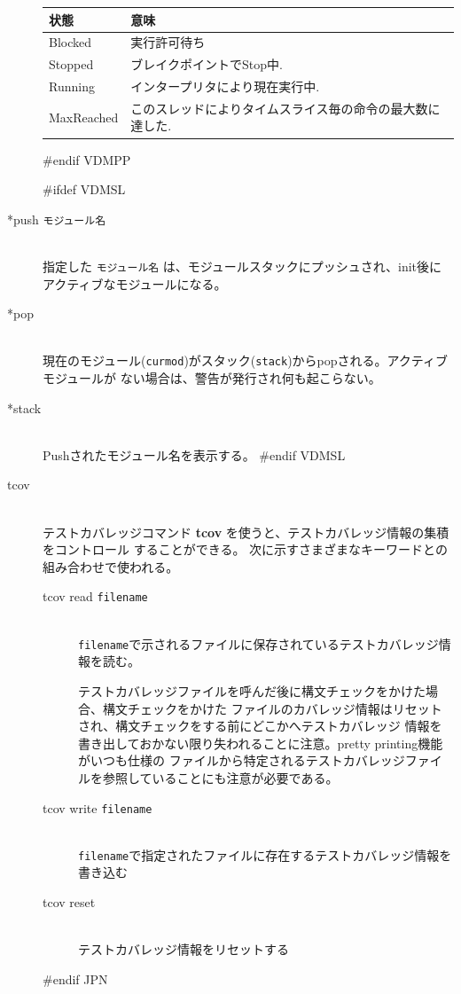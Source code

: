 \documentclass[\pformat,12pt]{article}
\begin{document}
\begin{description}
\begin{tabular}{lp{10cm}}\hline
状態 & 意味 \\ \hline
Blocked    & 実行許可待ち \\ 
Stopped    & ブレイクポイントでStop中.\\
Running    & インタープリタにより現在実行中. \\
MaxReached & このスレッドによりタイムスライス毎の命令の最大数に達した. \\ \hline 
\end{tabular}
#endif VDMPP

#ifdef VDMSL
\item[*push {\tt モジュール名}] \mbox{}\\
  指定した {\tt モジュール名} は、モジュールスタックにプッシュされ、init後にアクティブなモジュールになる。 
  
\item[*pop] \mbox{}\\
  現在のモジュール({\tt curmod})がスタック({\tt stack})からpopされる。アクティブモジュールが
  ない場合は、警告が発行され何も起こらない。
  
\item[*stack]\mbox{}\\
  Pushされたモジュール名を表示する。
#endif VDMSL

\item[tcov]\mbox{}\\
テストカバレッジコマンド {\bf tcov} を使うと、テストカバレッジ情報の集積をコントロール
することができる。
次に示すさまざまなキーワードとの組み合わせで使われる。

\begin{description}
\item[tcov read \mbox{\texttt{filename}}] \mbox{}\\ 
  \texttt{filename}で示されるファイルに保存されているテストカバレッジ情報を読む。
  
  テストカバレッジファイルを呼んだ後に構文チェックをかけた場合、構文チェックをかけた
  ファイルのカバレッジ情報はリセットされ、構文チェックをする前にどこかへテストカバレッジ
  情報を書き出しておかない限り失われることに注意。pretty printing機能がいつも仕様の
  ファイルから特定されるテストカバレッジファイルを参照していることにも注意が必要である。

\item[tcov write \mbox{\texttt{filename}}] \mbox{} \\ 
  \texttt{filename}で指定されたファイルに存在するテストカバレッジ情報を書き込む
  
\item[tcov reset] \mbox{} \\
  テストカバレッジ情報をリセットする
  
\end{description}
#endif JPN

\end{description}
\end{document}
